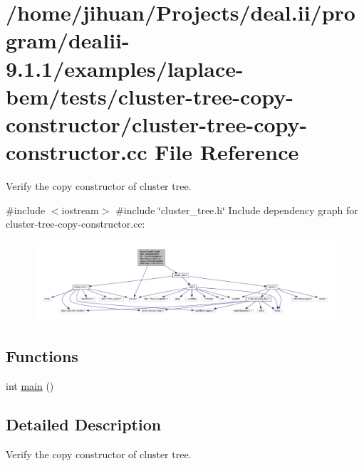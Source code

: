 \hypertarget{cluster-tree-copy-constructor_8cc}{}\section{/home/jihuan/\+Projects/deal.ii/program/dealii-\/9.1.1/examples/laplace-\/bem/tests/cluster-\/tree-\/copy-\/constructor/cluster-\/tree-\/copy-\/constructor.cc File Reference}
\label{cluster-tree-copy-constructor_8cc}


Verify the copy constructor of cluster tree.  


{\ttfamily \#include $<$iostream$>$}\newline
{\ttfamily \#include \char`\"{}cluster\+\_\+tree.\+h\char`\"{}}\newline
Include dependency graph for cluster-\/tree-\/copy-\/constructor.cc\+:\nopagebreak
\begin{figure}[H]
\begin{center}
\leavevmode
\includegraphics[width=350pt]{cluster-tree-copy-constructor_8cc__incl}
\end{center}
\end{figure}
\subsection*{Functions}
\begin{DoxyCompactItemize}
\item 
int \hyperlink{cluster-tree-copy-constructor_8cc_ae66f6b31b5ad750f1fe042a706a4e3d4}{main} ()
\end{DoxyCompactItemize}


\subsection{Detailed Description}
Verify the copy constructor of cluster tree. 


